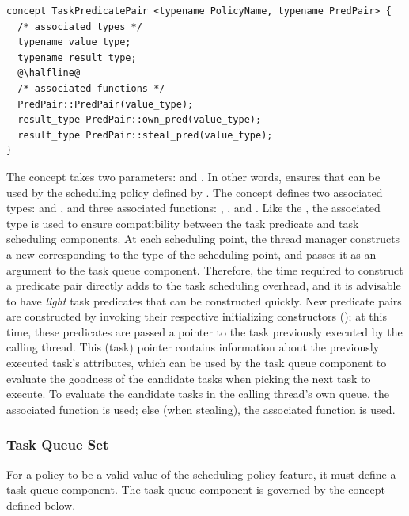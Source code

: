 \begin{lstlisting}
concept TaskPredicatePair <typename PolicyName, typename PredPair> {
  /* associated types */
  typename value_type;
  typename result_type;
  @\halfline@
  /* associated functions */
  PredPair::PredPair(value_type);
  result_type PredPair::own_pred(value_type);
  result_type PredPair::steal_pred(value_type);
}
\end{lstlisting}
% 
The  concept takes two parameters:
 and . 
%
In other words,  ensures that  can
be used by the scheduling policy defined by .
%
The  concept defines two associated types: 
 and , and three associated functions:
, , and .
%
Like the , the  associated type is used to 
ensure compatibility between the task predicate and task scheduling components.
%
At each scheduling point, the thread manager constructs a new 
corresponding to the type of the scheduling point, and passes it as an argument
to the task queue component.
%
Therefore, the time required to construct a predicate pair directly adds to
the task scheduling overhead, and it is advisable to have \emph{light} task
predicates that can be constructed quickly.
%
New predicate pairs are constructed by invoking their respective initializing
constructors (); at this time, these predicates are
passed a pointer to the task previously executed by the calling thread.
%
This (task) pointer contains information about the previously executed task's
attributes, which can be used by the task queue component to evaluate the
goodness of the candidate tasks when picking the next task to execute.
%
To evaluate the candidate tasks in the calling thread's own queue, the
 associated function is used; else (when stealing),
the  associated function is used.

\subsubsection{Task Queue Set}
\label{subsubsec:task_queue_set}
%
For a policy to be a valid value of the scheduling policy feature, it must
define a task queue component. 
%
The task queue component is governed by the  concept
defined below.

